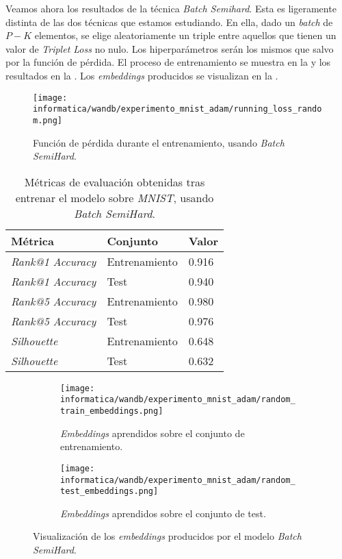 Veamos ahora los resultados de la técnica \textit{Batch Semihard}. Esta es ligeramente distinta de las dos técnicas que estamos estudiando. En ella, dado un \textit{batch} de $P-K$ elementos, se elige aleatoriamente un triple entre aquellos que tienen un valor de \textit{Triplet Loss} no nulo. Los hiperparámetros serán los mismos que  salvo por la función de pérdida. El proceso de entrenamiento se muestra en la  y los resultados en la . Los \textit{embeddings} producidos se visualizan en la .

\begin{figure}[!hbtp]
    \centering
    \texttt{[image: informatica/wandb/experimento\_mnist\_adam/running\_loss\_random.png]}
    \caption{Función de pérdida durante el entrenamiento, usando \textit{Batch SemiHard}.}
    \label{img:proceso_entrenamiento_adam_mnist_random}
\end{figure}

\begin{table}[!hbtp]
\centering
\begin{tabular}{|l|l|l|}
    \hline
    Métrica & Conjunto & Valor \\
    \hline

    \textit{Rank@1 Accuracy} & Entrenamiento & 0.916  \\
    \textit{Rank@1 Accuracy} & Test & 0.940  \\
    \textit{Rank@5 Accuracy} & Entrenamiento & 0.980   \\
    \textit{Rank@5 Accuracy} & Test & 0.976  \\
    \textit{Silhouette} & Entrenamiento & 0.648 \\
    \textit{Silhouette} & Test & 0.632 \\
    \hline


\end{tabular}
\caption{Métricas de evaluación obtenidas tras entrenar el modelo sobre \textit{MNIST}, usando \textit{Batch SemiHard}.}
\label{table:resultados_adam_mnist_random}
\end{table}

\begin{figure} [!hbtp]
\ajustarsubcaptions
\centering
    \begin{subfigure}{.5\textwidth}
        \centering
        \texttt{[image: informatica/wandb/experimento\_mnist\_adam/random\_train\_embeddings.png]}
        \caption{\textit{Embeddings} aprendidos sobre el conjunto de entrenamiento.}
    \end{subfigure}%
    \begin{subfigure}{.5\textwidth}
        \centering
        \texttt{[image: informatica/wandb/experimento\_mnist\_adam/random\_test\_embeddings.png]}
        \caption{\textit{Embeddings} aprendidos sobre el conjunto de test.}
    \end{subfigure}
\caption{Visualización de los \textit{embeddings} producidos por el modelo \textit{Batch SemiHard}.}
\label{img:embeddings_adam_random}
\end{figure}

